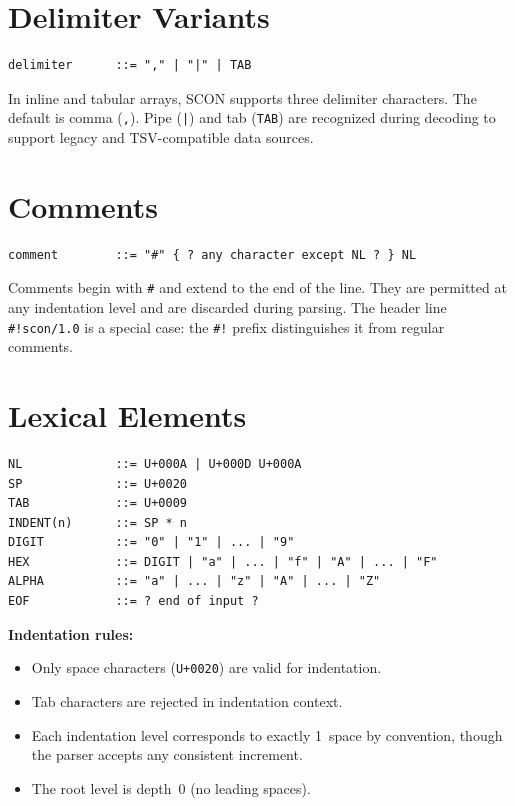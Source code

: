 \documentclass[11pt, a4paper]{article}
\begin{document}
\section{Delimiter Variants}
\label{sec:delimiters}

\begin{lstlisting}[style=ebnf]
delimiter      ::= "," | "|" | TAB
\end{lstlisting}

\noindent In inline and tabular arrays, SCON supports three delimiter
characters. The default is comma (\texttt{,}). Pipe (\texttt{|}) and
tab (\texttt{TAB}) are recognized during decoding to support legacy
and TSV-compatible data sources.

\section{Comments}
\label{sec:comments}

\begin{lstlisting}[style=ebnf]
comment        ::= "#" { ? any character except NL ? } NL
\end{lstlisting}

\noindent Comments begin with \texttt{\#} and extend to the end of the line.
They are permitted at any indentation level and are discarded during parsing.
The header line \texttt{\#!scon/1.0} is a special case: the \texttt{\#!}
prefix distinguishes it from regular comments.

\section{Lexical Elements}
\label{sec:lexical}

\begin{lstlisting}[style=ebnf]
NL             ::= U+000A | U+000D U+000A
SP             ::= U+0020
TAB            ::= U+0009
INDENT(n)      ::= SP * n
DIGIT          ::= "0" | "1" | ... | "9"
HEX            ::= DIGIT | "a" | ... | "f" | "A" | ... | "F"
ALPHA          ::= "a" | ... | "z" | "A" | ... | "Z"
EOF            ::= ? end of input ?
\end{lstlisting}

\noindent \textbf{Indentation rules:}
\begin{itemize}
\item Only space characters (\texttt{U+0020}) are valid for indentation.
\item Tab characters are rejected in indentation context.
\item Each indentation level corresponds to exactly 1~space by convention,
      though the parser accepts any consistent increment.
\item The root level is depth~0 (no leading spaces).
\end{itemize}
\end{document}
